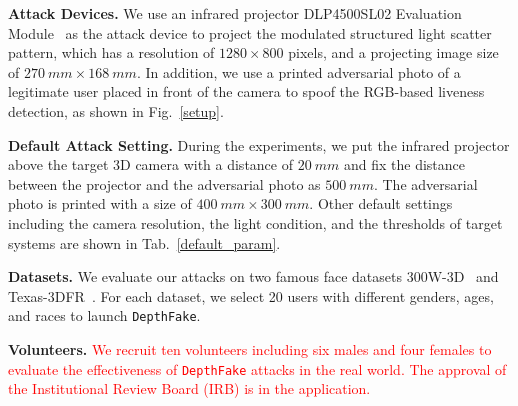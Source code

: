 \textbf{Attack Devices.} We use an infrared projector DLP4500SL02 Evaluation Module~\cite{chong2017intraoperative} as the attack device to project the modulated structured light scatter pattern, which has a resolution of $1280 \times 800$ pixels, and a projecting image size of $270~mm \times 168~mm$.
In addition, we use a printed adversarial photo of a legitimate user placed in front of the camera to spoof the RGB-based liveness detection, as shown in Fig.~\ref{setup}.

\textbf{Default Attack Setting.} During the experiments, we put the infrared projector above the target 3D camera with a distance of $20~mm$ and fix the distance between the projector and the adversarial photo as $500~mm$.
The adversarial photo is printed with a  size of $400~mm \times 300~mm$.
Other default settings including the camera resolution, the light condition, and the thresholds of target systems are shown in Tab.~\ref{default_param}.


\textbf{Datasets.} We evaluate our attacks on two famous face datasets  300W-3D~\cite{zhu2016face} and Texas-3DFR~\cite{gupta2010anthropometric, gupta2010texas}. 
For each dataset, we select 20 users with different genders, ages, and races to launch \texttt{DepthFake}.


\textbf{Volunteers.} \textcolor{red}{ We recruit ten volunteers including six males and four females to evaluate the effectiveness of \texttt{DepthFake} attacks in the real world. The approval of the Institutional Review Board (IRB) is in the application.}




